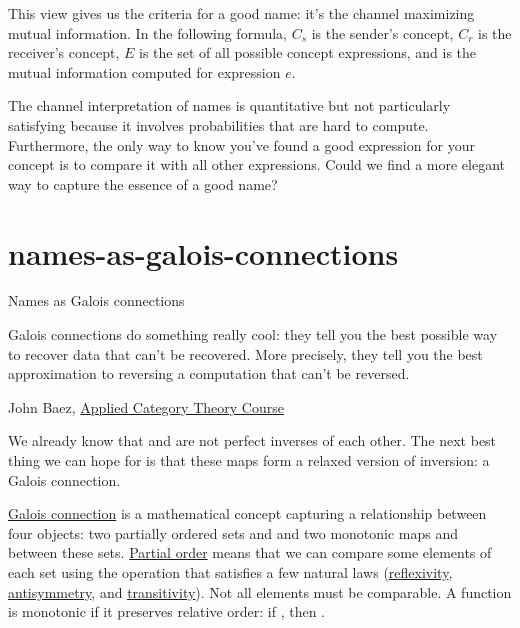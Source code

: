 \documentclass{article}
\begin{document}
This view gives us the criteria for a good name:
it's the channel maximizing mutual information.
In the following formula,
$C_s$ is the sender's concept,
$C_r$ is the receiver's concept,
$E$ is the set of all possible concept expressions,
and
is the mutual information computed for expression $e$.


The channel interpretation of names is quantitative but not particularly satisfying because it involves probabilities that are hard to compute.
Furthermore, the only way to know you've found a good expression for your concept is to compare it with all other expressions.
Could we find a more elegant way to capture the essence of a good name?

\section{names-as-galois-connections}{Names as Galois connections}
\epigraph{
  Galois connections do something really cool: they tell you the best possible way to recover data that can't be recovered.
  More precisely, they tell you the best approximation to reversing a computation that can't be reversed.
}{John Baez, \href{https://math.ucr.edu/home/baez/act_course/lecture_5.html}{Applied Category Theory Course}}

We already know that  and  are not perfect inverses of each other.
The next best thing we can hope for is that these maps form a relaxed version of inversion: a Galois connection.

\href{https://en.wikipedia.org/wiki/Galois_connection}{Galois connection}
is a mathematical concept capturing a relationship between four objects:
two partially ordered sets  and 
and two monotonic maps  and  between these sets.
\href{https://en.wikipedia.org/wiki/Partially_ordered_set#Partial_orders}{Partial order}
means that we can compare some elements of each set using the \mathml{\mo{\leq}} operation that satisfies a few natural laws
(\href{https://en.wikipedia.org/wiki/Reflexive_relation}{reflexivity},
\href{https://en.wikipedia.org/wiki/Antisymmetric_relation}{antisymmetry},
and \href{https://en.wikipedia.org/wiki/Transitive_relation}{transitivity}).
Not all elements must be comparable.
A function  is monotonic if it preserves relative order:
if ,
then .
\end{document}
